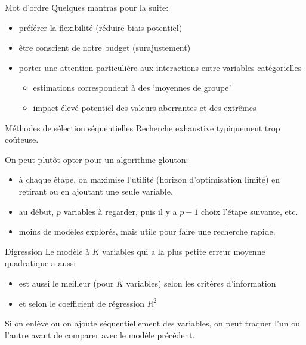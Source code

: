 \documentclass[
  ignorenonframetext,
]{beamer}
\providecommand{\tightlist}{%
  \setlength{\itemsep}{0pt}\setlength{\parskip}{0pt}}\usepackage{longtable,booktabs,array}
\begin{document}
\begin{frame}{Mot d'ordre}
\protect\hypertarget{mot-dordre}{}
Quelques mantras pour la suite:

\begin{itemize}
\tightlist
\item
  préférer la flexibilité (réduire biais potentiel)
\item
  être conscient de notre budget (surajustement)
\item
  porter une attention particulière aux interactions entre variables
  catégorielles

  \begin{itemize}
  \tightlist
  \item
    estimations correspondent à des `moyennes de groupe'
  \item
    impact élevé potentiel des valeurs aberrantes et des extrêmes
  \end{itemize}
\end{itemize}
\end{frame}

\begin{frame}{Méthodes de sélection séquentielles}
\protect\hypertarget{muxe9thodes-de-suxe9lection-suxe9quentielles}{}
Recherche exhaustive typiquement trop coûteuse.

On peut plutôt opter pour un algorithme glouton:

\begin{itemize}
\tightlist
\item
  à chaque étape, on maximise l'utilité (horizon d'optimisation limité)
  en retirant ou en ajoutant une seule variable.
\item
  au début, \(p\) variables à regarder, puis il y a \(p-1\) choix
  l'étape suivante, etc.
\item
  moins de modèles explorés, mais utile pour faire une recherche rapide.
\end{itemize}
\end{frame}

\begin{frame}{Digression}
\protect\hypertarget{digression}{}
Le modèle à \(K\) variables qui a la plus petite erreur moyenne
quadratique a aussi

\begin{itemize}
\tightlist
\item
  est aussi le meilleur (pour \(K\) variables) selon les critères
  d'information
\item
  et selon le coefficient de régression \(R^2\)
\end{itemize}

Si on enlève ou on ajoute séquentiellement des variables, on peut
traquer l'un ou l'autre avant de comparer avec le modèle précédent.
\end{frame}
\end{document}
